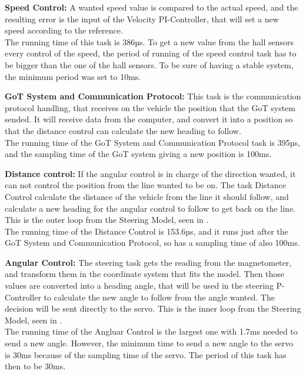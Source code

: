\textbf{Speed Control:}
A wanted speed value is compared to the actual speed, and the resulting error is the input of the Velocity PI-Controller, that will set a new speed according to the reference.\\
The running time of this task is 386µs. To get a new value from the hall sensors every control of the speed, the period of running of the speed control task has to be bigger than the one of the hall sensors. To be sure of having a stable system, the minimum period was set to 10ms.


\textbf{GoT System and Communication Protocol:}
This task is the communication protocol handling, that receives on the vehicle the position that the GoT system sended. It will receive data from the computer, and convert it into a position so that the distance control can calculate the new heading to follow.\\
The running time of the GoT System and Communication Protocol task is 395µs, and the sampling time of the GoT system giving a new position is 100ms.

\textbf{Distance control:}
If the angular control is in charge of the direction wanted, it can not control the position from the line wanted to be on. The task Distance Control calculate the distance of the vehicle from the line it should follow, and calculate a new heading for the angular control to follow to get back on the line. This is the outer loop from the Steering Model, seen in .\\
The running time of the Distance Control is 153.6µs, and it runs just after the GoT System and Communication Protocol, so has a sampling time of also 100ms.

\textbf{Angular Control:}
The steering task gets the reading from the magnetometer, and transform them in the coordinate system that fits the model. Then those values are converted into a heading angle, that will be used in the steering P-Controller to calculate the new angle to follow from the angle wanted. The decision will be sent directly to the servo. This is the inner loop from the Steering Model, seen in .\\
The running time of the Angluar Control is the largest one with 1.7ms needed to send a new angle. However, the minimum time to send a new angle to the servo is 30ms because of the sampling time of the servo. The period of this task has then to be 30ms.\\\\


